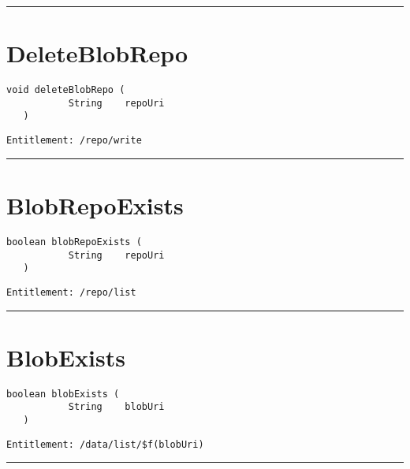 \rule{12cm}{2pt}
\section{DeleteBlobRepo}
\label{Api:DeleteBlobRepo}
\begin{lstlisting}[style=nonumbers]
   void deleteBlobRepo (
           String    repoUri
   )
\end{lstlisting}
\begin{Verbatim}[formatcom=\color{Maroon}]
  Entitlement: /repo/write
\end{Verbatim}



\rule{12cm}{2pt}
\section{BlobRepoExists}
\label{Api:BlobRepoExists}
\begin{lstlisting}[style=nonumbers]
   boolean blobRepoExists (
           String    repoUri
   )
\end{lstlisting}
\begin{Verbatim}[formatcom=\color{Maroon}]
  Entitlement: /repo/list
\end{Verbatim}



\rule{12cm}{2pt}
\section{BlobExists}
\label{Api:BlobExists}
\begin{lstlisting}[style=nonumbers]
   boolean blobExists (
           String    blobUri
   )
\end{lstlisting}
\begin{Verbatim}[formatcom=\color{Maroon}]
  Entitlement: /data/list/$f(blobUri)
\end{Verbatim}



\rule{12cm}{2pt}
